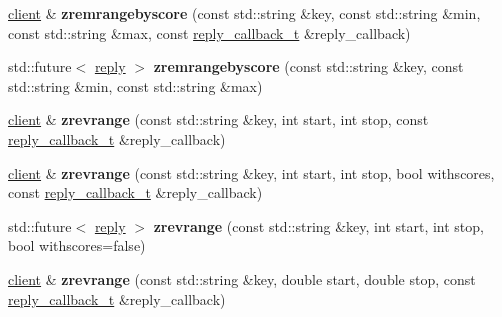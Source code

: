 \begin{DoxyCompactItemize}
\mbox{\label{classcpp__redis_1_1client_a4a9c526f56dc158345f359961c9f9a7d}} 
\hyperlink{classcpp__redis_1_1client}{client} \& {\bfseries zremrangebyscore} (const std\+::string \&key, const std\+::string \&min, const std\+::string \&max, const \hyperlink{classcpp__redis_1_1client_a061a1140d36d2eaeda82b09a0bb3f9f2}{reply\+\_\+callback\+\_\+t} \&reply\+\_\+callback)
\item 
\mbox{\label{classcpp__redis_1_1client_afdef5244240e2c54c9738be66807e8f6}} 
std\+::future$<$ \hyperlink{classcpp__redis_1_1reply}{reply} $>$ {\bfseries zremrangebyscore} (const std\+::string \&key, const std\+::string \&min, const std\+::string \&max)
\item 
\mbox{\label{classcpp__redis_1_1client_ad408a62269d10de02605de9acec1ddc0}} 
\hyperlink{classcpp__redis_1_1client}{client} \& {\bfseries zrevrange} (const std\+::string \&key, int start, int stop, const \hyperlink{classcpp__redis_1_1client_a061a1140d36d2eaeda82b09a0bb3f9f2}{reply\+\_\+callback\+\_\+t} \&reply\+\_\+callback)
\item 
\mbox{\label{classcpp__redis_1_1client_a37bfbe4848350144e7899c6d1e63653b}} 
\hyperlink{classcpp__redis_1_1client}{client} \& {\bfseries zrevrange} (const std\+::string \&key, int start, int stop, bool withscores, const \hyperlink{classcpp__redis_1_1client_a061a1140d36d2eaeda82b09a0bb3f9f2}{reply\+\_\+callback\+\_\+t} \&reply\+\_\+callback)
\item 
\mbox{\label{classcpp__redis_1_1client_a001bdf0f597d386202b0aab116657055}} 
std\+::future$<$ \hyperlink{classcpp__redis_1_1reply}{reply} $>$ {\bfseries zrevrange} (const std\+::string \&key, int start, int stop, bool withscores=false)
\item 
\mbox{\label{classcpp__redis_1_1client_a7b20d0dc47cf4fb40220e51408876d6d}} 
\hyperlink{classcpp__redis_1_1client}{client} \& {\bfseries zrevrange} (const std\+::string \&key, double start, double stop, const \hyperlink{classcpp__redis_1_1client_a061a1140d36d2eaeda82b09a0bb3f9f2}{reply\+\_\+callback\+\_\+t} \&reply\+\_\+callback)
\item 
\mbox{\label{classcpp__redis_1_1client_ac03871ced545f10c9f277fd5fc20f0a0}} 

\end{DoxyCompactItemize}
